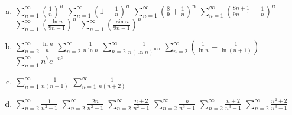\documentclass{article}
\begin{document}
\begin{enumerate}[(a)]
\vfill



\item \quad 
\href{https://edward-kim-math.github.io/key/series/d1.pdf}{$\displaystyle \sum_{n=1}^\infty \textstyle \left(\frac1n\right)^n$}
\quad
\href{https://edward-kim-math.github.io/key/series/d2.pdf}{$\displaystyle \sum_{n=1}^\infty \textstyle \left(1+\frac1n\right)^n$}
\quad
\href{https://edward-kim-math.github.io/key/series/d3.pdf}{$\displaystyle \sum_{n=1}^\infty \textstyle \left(\frac89+\frac1n\right)^n$}
\quad
\href{https://edward-kim-math.github.io/key/series/d4.pdf}{$\displaystyle \sum_{n=1}^\infty \left(\frac{8n+1}{9n-1}+\frac1n\right)^n$}
\quad
\href{https://edward-kim-math.github.io/key/series/d5.pdf}{$\displaystyle \sum_{n=1}^\infty \left(\frac{\ln n}{9n-1}\right)^n$}
\quad
\href{https://edward-kim-math.github.io/key/series/d6.pdf}{$\displaystyle \sum_{n=1}^\infty \left(\frac{\sin n}{9n-1}\right)^n$}

\vfill

\item \quad 
\href{https://edward-kim-math.github.io/key/series/e1.pdf}{$\displaystyle \sum_{n=2}^\infty \frac{\ln n}{n}$}
\quad
\href{https://edward-kim-math.github.io/key/series/e2.pdf}{$\displaystyle \sum_{n=2}^\infty \frac1{n \ln n}$}
\quad
\href{https://edward-kim-math.github.io/key/series/e3.pdf}{$\displaystyle \sum_{n=2}^\infty \frac1{n (\ln n)^{100}}$}
\quad
\href{https://edward-kim-math.github.io/key/series/e4.pdf}{$\displaystyle \sum_{n=2}^\infty \left(\frac1{\ln n} - \frac1{\ln (n+1)}\right)$}
\quad
\href{https://edward-kim-math.github.io/key/series/e5.pdf}{$\displaystyle \sum_{n=1}^\infty n^7e^{-n^8}$}

\vfill

\item \quad 
\href{https://edward-kim-math.github.io/key/series/f1.pdf}{$\displaystyle \sum_{n=1}^\infty \frac1{n(n+1)}$}
\quad
\href{https://edward-kim-math.github.io/key/series/f2.pdf}{$\displaystyle \sum_{n=1}^\infty \frac1{n(n+2)}$}

\vfill

\item \quad 
\href{https://edward-kim-math.github.io/key/series/g1.pdf}{$\displaystyle \sum_{n=2}^\infty \frac1{n^2-1}$}
\quad
\href{https://edward-kim-math.github.io/key/series/g2.pdf}{$\displaystyle \sum_{n=2}^\infty \frac{2n}{n^2-1}$}
\quad
\href{https://edward-kim-math.github.io/key/series/g3.pdf}{$\displaystyle \sum_{n=2}^\infty \frac{n+2}{n^2-1}$}
\quad
\href{https://edward-kim-math.github.io/key/series/g4.pdf}{$\displaystyle \sum_{n=2}^\infty \frac{n}{n^3-1}$}
\quad
\href{https://edward-kim-math.github.io/key/series/g5.pdf}{$\displaystyle \sum_{n=2}^\infty \frac{n+2}{n^3-1}$}
\quad
\href{https://edward-kim-math.github.io/key/series/g6.pdf}{$\displaystyle \sum_{n=2}^\infty \frac{n^2+2}{n^3-1}$}
\vfill


\end{enumerate}
\end{document}
